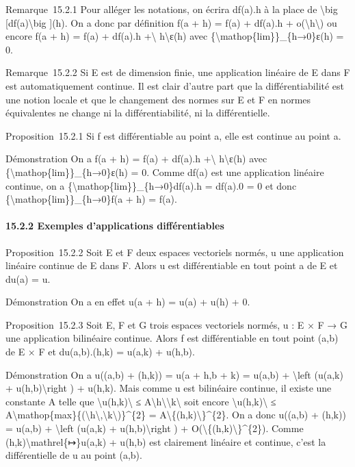 \documentclass[]{article}
\begin{document}
Remarque~15.2.1 Pour alléger les notations, on écrira df(a).h à la place
de \textbackslash{}big {[}df(a)\textbackslash{}big {]}(h). On a donc par
définition f(a + h) = f(a) + df(a).h +
o(\textbackslash{}\textbar{}h\textbackslash{}\textbar{}) ou encore f(a +
h) = f(a) + df(a).h +\textbackslash{}\textbar{}
h\textbackslash{}\textbar{}ε(h) avec
\{\textbackslash{}mathop\{lim\}\}\_\{h→0\}ε(h) = 0.

Remarque~15.2.2 Si E est de dimension finie, une application linéaire de
E dans F est automatiquement continue. Il est clair d'autre part que la
différentiabilité est une notion locale et que le changement des normes
sur E et F en normes équivalentes ne change ni la différentiabilité, ni
la différentielle.

Proposition~15.2.1 Si f est différentiable au point a, elle est continue
au point a.

Démonstration On a f(a + h) = f(a) + df(a).h +\textbackslash{}\textbar{}
h\textbackslash{}\textbar{}ε(h) avec
\{\textbackslash{}mathop\{lim\}\}\_\{h→0\}ε(h) = 0. Comme df(a) est une
application linéaire continue, on a
\{\textbackslash{}mathop\{lim\}\}\_\{h→0\}df(a).h = df(a).0 = 0 et donc
\{\textbackslash{}mathop\{lim\}\}\_\{h→0\}f(a + h) = f(a).

\paragraph{15.2.2 Exemples d'applications différentiables}

Proposition~15.2.2 Soit E et F deux espaces vectoriels normés, u une
application linéaire continue de E dans F. Alors u est différentiable en
tout point a de E et du(a) = u.

Démonstration On a en effet u(a + h) = u(a) + u(h) + 0.

Proposition~15.2.3 Soit E, F et G trois espaces vectoriels normés, u : E
× F → G une application bilinéaire continue. Alors f est différentiable
en tout point (a,b) de E × F et du(a,b).(h,k) = u(a,k) + u(h,b).

Démonstration On a u((a,b) + (h,k)) = u(a + h,b + k) = u(a,b) +
\textbackslash{}left (u(a,k) + u(h,b)\textbackslash{}right ) + u(h,k).
Mais comme u est bilinéaire continue, il existe une constante A telle
que \textbackslash{}\textbar{}u(h,k)\textbackslash{}\textbar{} ≤
A\textbackslash{}\textbar{}h\textbackslash{}\textbar{}\textbackslash{}\textbar{}k\textbackslash{}\textbar{}
soit encore \textbackslash{}\textbar{}u(h,k)\textbackslash{}\textbar{} ≤
A\textbackslash{}mathop\{max\}\{(\textbackslash{}\textbar{}h\textbackslash{}\textbar{},\textbackslash{}\textbar{}k\textbackslash{}\textbar{})\}\^{}\{2\}
=
A\textbackslash{}\textbar{}\{(h,k)\textbackslash{}\textbar{}\}\^{}\{2\}.
On a donc u((a,b) + (h,k)) = u(a,b) + \textbackslash{}left (u(a,k) +
u(h,b)\textbackslash{}right ) +
O(\textbackslash{}\textbar{}\{(h,k)\textbackslash{}\textbar{}\}\^{}\{2\}).
Comme (h,k)\textbackslash{}mathrel\{↦\}u(a,k) + u(h,b) est clairement
linéaire et continue, c'est la différentielle de u au point (a,b).
\end{document}
